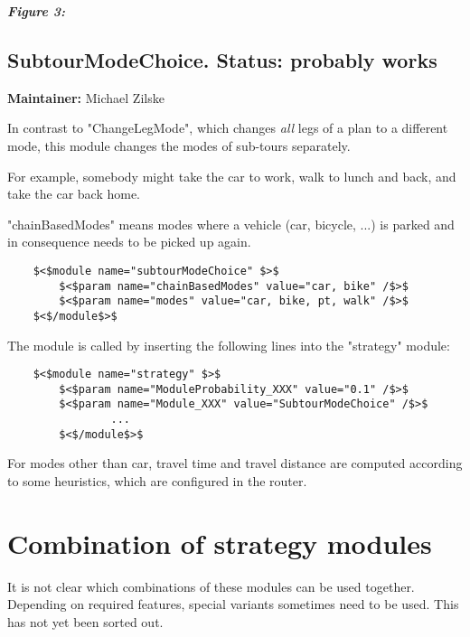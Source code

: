 


\emph{\textbf{Figure 3:}}








\subsection{SubtourModeChoice. Status: probably works}

\textbf{Maintainer:} Michael Zilske

In contrast to "ChangeLegMode", which changes \emph{all} legs of a plan to a different mode, this module changes the modes of sub-tours separately.

For example, somebody might take the car to work, walk to lunch and back, and take the car back home.

"chainBasedModes" means modes where a vehicle (car, bicycle,  ...) is parked and in consequence needs to be picked up again.
\begin{verbatim}
	$<$module name="subtourModeChoice" $>$
		$<$param name="chainBasedModes" value="car, bike" /$>$
		$<$param name="modes" value="car, bike, pt, walk" /$>$
	$<$/module$>$

\end{verbatim}

The module is called by inserting the following lines into the "strategy" module:
\begin{verbatim}
	$<$module name="strategy" $>$
		$<$param name="ModuleProbability_XXX" value="0.1" /$>$
		$<$param name="Module_XXX" value="SubtourModeChoice" /$>$
                ...
        $<$/module$>$

\end{verbatim}


For modes other than car, travel time and travel distance are  computed according to some heuristics, which are configured in the  router.

\vfill\eject
\section{Combination of strategy modules}

It  is not clear which combinations of these modules can be used together.  Depending on required features, special variants sometimes need to be  used. This has not yet been sorted out.

